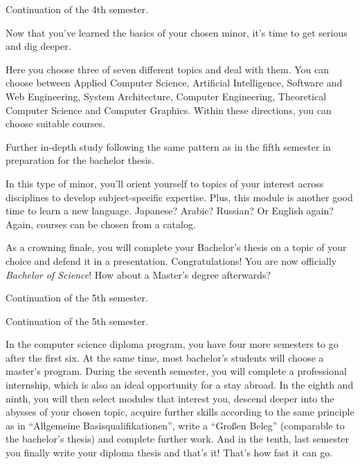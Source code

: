 Continuation of the 4th semester.

Now that you've learned the basics of your chosen minor, it's time to get serious and dig deeper.

Here you choose three of seven different topics and deal with them.
You can choose between Applied Computer Science, Artificial Intelligence, Software and Web Engineering, System Architecture, Computer Engineering, Theoretical Computer Science and Computer Graphics.
Within these directions, you can choose suitable courses.


Further in-depth study following the same pattern as in the fifth semester in preparation for the bachelor thesis.

\label{lec:aqua}
In this type of minor, you'll orient yourself to topics of your interest across disciplines to develop subject-specific expertise.
Plus, this module is another good time to learn a new language. Japanese? Arabic? Russian? Or English again?
Again, courses can be chosen from a catalog.

\newpage

As a crowning finale, you will complete your Bachelor's thesis on a topic of your choice and defend it in a presentation.
Congratulations! You are now officially \textit{Bachelor of Science}! How about a Master's degree afterwards?

Continuation of the 5th semester.

Continuation of the 5th semester.


In the computer science diploma program, you have four more semesters to go after the first six. At the same time, most bachelor's students will choose a master's program.
During the seventh semester, you will complete a professional internship, which is also an ideal opportunity for a stay abroad.
In the eighth and ninth, you will then select modules that interest you, descend deeper into the abysses of your chosen topic, acquire further skills according to the same principle as in \enquote{Allgemeine Basisqualifikationen}, write a \enquote{Großen Beleg} (comparable to the bachelor's thesis) and complete further work.
And in the tenth, last semester you finally write your diploma thesis and that's it!
That's how fast it can go.

